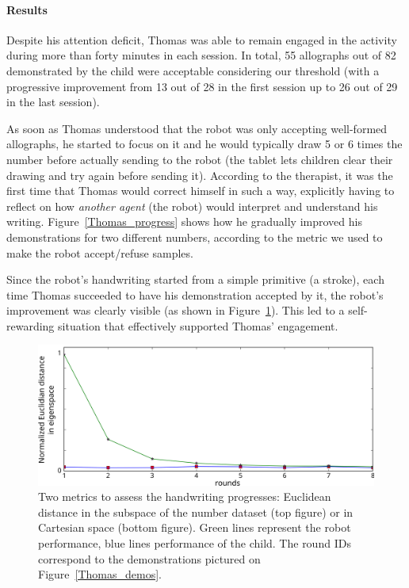 \documentclass{article}
\begin{document}
%

\paragraph{Results}

Despite his attention deficit, Thomas was able to remain engaged in the activity during more than
forty minutes in each session. In total, 55 allographs out of 82 
demonstrated by the child were acceptable considering our threshold (with a
progressive improvement from 13 out of 28 in the first session up to 26 out
of 29 in the last session).

As soon as Thomas understood that the robot was only accepting well-formed
allographs, he started to focus on it and he would typically draw 5 or 6 times
the number before actually sending to the robot (the tablet lets children
clear their drawing and try again before sending it). According to
the therapist, it was the first time that Thomas would correct himself in such a
way, explicitly having to reflect on how \emph{another agent} (the robot) would
interpret and understand his writing. Figure~\ref{Thomas_progress} shows how
he gradually improved his demonstrations for two different numbers, according to the
metric we used to make the robot accept/refuse samples.

Since the robot's handwriting started from a simple primitive (a stroke), each
time Thomas succeeded to have his demonstration accepted by it, the robot's
improvement was clearly visible (as shown in Figure~\ref{Thomas_distances}).
This led to a self-rewarding situation that effectively supported Thomas'
engagement.

\begin{figure}
    \centering
    \includegraphics[width=0.9\linewidth]{learning_6_distances}
    \caption{\small Two metrics to assess the handwriting progresses: Euclidean
    distance in the subspace of the number dataset (top figure) or in
Cartesian space (bottom figure). Green lines represent the robot performance,
blue lines performance of the child. The round IDs correspond to the demonstrations
pictured on Figure~\ref{Thomas_demos}.}
    \label{Thomas_distances}
\end{figure}
\end{document}
